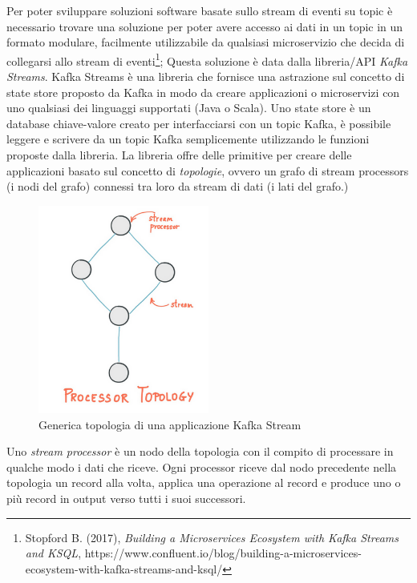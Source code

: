 \documentclass[]{article}
\begin{document}
Per poter sviluppare soluzioni software basate sullo stream di eventi su
topic è necessario trovare una soluzione per poter avere accesso ai dati
in un topic in un formato modulare, facilmente utilizzabile da qualsiasi
microservizio che decida di collegarsi allo stream di eventi\footnote{Stopford
  B. (2017), \emph{Building a Microservices Ecosystem with Kafka Streams
  and KSQL},
  https://www.confluent.io/blog/building-a-microservices-ecosystem-with-kafka-streams-and-ksql/};
Questa soluzione è data dalla libreria/API \emph{Kafka Streams}. Kafka
Streams è una libreria che fornisce una astrazione sul concetto di state
store proposto da Kafka in modo da creare applicazioni o microservizi
con uno qualsiasi dei linguaggi supportati (Java o Scala). Uno state
store è un database chiave-valore creato per interfacciarsi con un topic
Kafka, è possibile leggere e scrivere da un topic Kafka semplicemente
utilizzando le funzioni proposte dalla libreria. La libreria offre delle
primitive per creare delle applicazioni basato sul concetto di
\emph{topologie}, ovvero un grafo di stream processors (i nodi del
grafo) connessi tra loro da stream di dati (i lati del grafo.)

\begin{figure}
\centering
\includegraphics[width=0.50000\textwidth]{../images/topology-stream.png}
\caption{Generica topologia di una applicazione Kafka Stream
\label{figure_5}}
\end{figure}

Uno \emph{stream processor} è un nodo della topologia con il compito di
processare in qualche modo i dati che riceve. Ogni processor riceve dal
nodo precedente nella topologia un record alla volta, applica una
operazione al record e produce uno o più record in output verso tutti i
suoi successori.
\end{document}
